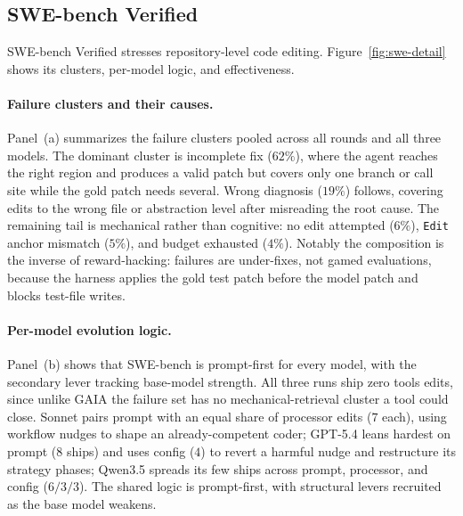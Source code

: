 \subsection{SWE-bench Verified}
\label{app:swe-detail}

SWE-bench Verified stresses repository-level code editing. 
Figure~\ref{fig:swe-detail} shows its clusters, per-model logic, and effectiveness.

\paragraph{Failure clusters and their causes.} 

Panel~(a) summarizes the failure clusters pooled across all rounds and all three models. The dominant cluster is incomplete fix ($62\%$), where the agent reaches the right region and produces a valid patch but covers only one branch or call site while the gold patch needs several. Wrong diagnosis ($19\%$) follows, covering edits to the wrong file or abstraction level after misreading the root cause. The remaining tail is mechanical rather than cognitive: no edit attempted ($6\%$), \texttt{Edit} anchor mismatch ($5\%$), and budget exhausted ($4\%$). Notably the composition is the inverse of reward-hacking: failures are under-fixes, not gamed evaluations, because the harness applies the gold test patch before the model patch and blocks test-file writes.
  
\paragraph{Per-model evolution logic.} 

Panel~(b) shows that SWE-bench is prompt-first for every model, with the secondary lever tracking base-model strength. All three runs ship zero tools edits, since unlike GAIA the failure set has no mechanical-retrieval cluster a tool could close. Sonnet pairs prompt with an equal share of processor edits ($7$ each), using workflow nudges to shape an already-competent coder; GPT-5.4 leans hardest on prompt ($8$ ships) and uses config ($4$) to revert a harmful nudge and restructure its strategy phases; Qwen3.5 spreads its few ships across prompt, processor, and config ($6/3/3$). The shared logic is prompt-first, with structural levers recruited as the base model weakens.


